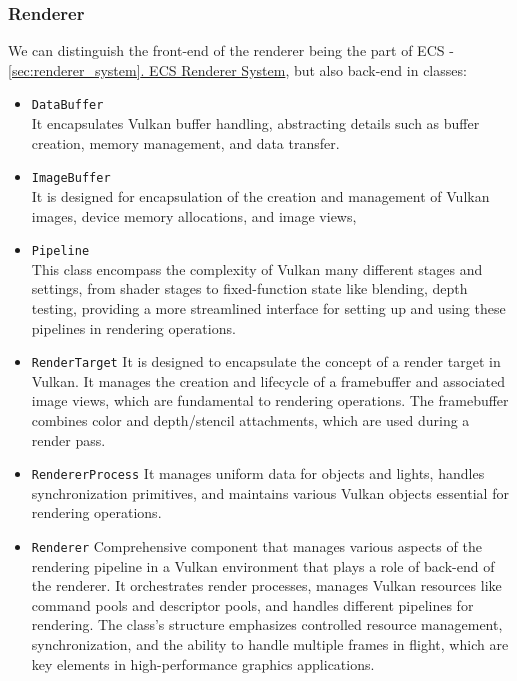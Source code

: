 \subsubsection{Renderer}
\label{sec:renderer}
\hspace{\parindent} We can distinguish the front-end of the renderer being the part of ECS - \hyperref[sec:renderer_system]{\ref*{sec:renderer_system}. ECS Renderer System}, but also back-end in classes:
\begin{itemize}
    \item \texttt{DataBuffer}\\
    It encapsulates Vulkan buffer handling, abstracting details such as buffer creation, memory management, and data transfer.
    \item \texttt{ImageBuffer}\\
    It is designed for encapsulation of the creation and management of Vulkan images, device memory allocations, and image views,
    \item \texttt{Pipeline}\\
    This class encompass the complexity of Vulkan many different stages and settings, from shader stages to fixed-function state like blending, depth testing, providing a more streamlined interface for setting up and using these pipelines in rendering operations. 
    \item \texttt{RenderTarget}
    It is designed to encapsulate the concept of a render target in Vulkan. It manages the creation and lifecycle of a framebuffer and associated image views, which are fundamental to rendering operations. The framebuffer combines color and depth/stencil attachments, which are used during a render pass. 
    \item \texttt{RendererProcess}
    It manages uniform data for objects and lights, handles synchronization primitives, and maintains various Vulkan objects essential for rendering operations.
    \item \texttt{Renderer}
    Comprehensive component that manages various aspects of the rendering pipeline in a Vulkan environment that plays a role of back-end of the renderer. It orchestrates render processes, manages Vulkan resources like command pools and descriptor pools, and handles different pipelines for rendering. The class's structure emphasizes controlled resource management, synchronization, and the ability to handle multiple frames in flight, which are key elements in high-performance graphics applications.
\end{itemize}